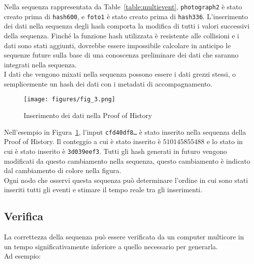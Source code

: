 \documentclass[12pt]{article}
\begin{document}
Nella sequenza rappresentata da Table~\ref{table:multievent}, \texttt{photograph2} è stato creato prima di \texttt{hash600}, e
\texttt{foto1} è stato creato prima di \texttt{hash336}. L'inserimento dei dati nella sequenza degli hash comporta la modifica di tutti i valori successivi della sequenza. Finché la funzione hash utilizzata è resistente alle collisioni e i dati sono stati aggiunti, dovrebbe essere impossibile calcolare in anticipo le sequenze future sulla base di una conoscenza preliminare dei dati che saranno integrati nella sequenza.\\

I dati che vengono mixati nella sequenza possono essere i dati grezzi stessi, o semplicemente un hash dei dati con i metadati di accompagnamento.\\

\begin{figure}[h]
  \begin{center}
    \centering
    \texttt{[image: figures/fig\_3.png]}
    \caption[Fig 3]{Inserimento dei dati nella Proof of History\label{fig:poh_insert}}
  \end{center}
  \end{figure}

  Nell'esempio in Figura~\ref{fig:poh_insert}, l'input \texttt{cfd40df8\ldots} è stato inserito nella sequenza della Proof of History. Il conteggio a cui è stato inserito è $510145855488$ e lo stato in cui è stato inserito è \texttt{3d039eef3}. Tutti gli hash generati in futuro vengono modificati da questo cambiamento nella sequenza, questo cambiamento è indicato dal cambiamento di colore nella figura.\\

Ogni nodo che osservi questa sequenza può determinare l'ordine in cui sono stati inseriti tutti gli eventi e stimare il tempo reale tra gli inserimenti.

\subsection{Verifica}\label{poh:verify}
La correttezza della sequenza può essere verificata da un computer multicore in un tempo significativamente inferiore a quello necessario per generarla.\\

\noindent Ad esempio: \\\noindent
\end{document}
